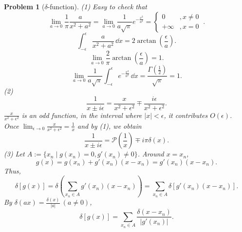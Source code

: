 \documentclass{article}
\theoremstyle{1}
\newtheorem{problem}{Problem}
\begin{document}
\begin{problem}[$\delta$-function]
    (1) Easy to check that 
    \begin{equation}
        \lim_{a\rightarrow0}\frac{1}{\pi}\frac{a}{x^2+a^2}=\lim_{a\rightarrow0}\frac{1}{a\sqrt{\pi}}e^{-\frac{x^2}{a^2}}=\left\{\begin{matrix}
            0&,x\not=0\\
            +\infty&,x=0
        \end{matrix}\ .\right.
    \end{equation}
    \begin{equation}
        \int_{-\epsilon}^{\epsilon}\frac{a}{x^2+a^2}\, \dd{x}=2\arctan(\frac{\epsilon}{a}).
    \end{equation}
    \begin{equation}
        \lim_{a\rightarrow0}\frac{2}{\pi}\arctan(\frac{\epsilon}{a})=1.
    \end{equation}
    \begin{equation}
        \lim_{a\rightarrow0}\frac{1}{a\sqrt{\pi}}\int_{-\epsilon}^{\epsilon}e^{-\frac{x^2}{a^2}}\, \dd{x}=\frac{\Gamma(\frac{1}{2})}{\sqrt{\pi}}=1.
    \end{equation}
    (2) \begin{equation}
        \frac{1}{x\pm i\epsilon}=\frac{x}{x^2+\epsilon^2}\mp\frac{i\epsilon}{x^2+\epsilon^2}.
    \end{equation}
    $\frac{x}{x^2+\epsilon^2}$ is an odd function, in the interval where $\left|x\right|<\epsilon$, it contributes $O(\epsilon)$. Once $\lim_{\epsilon\rightarrow0}\frac{x}{x^2+\epsilon^2}=\frac{1}{x}$ and by (1), we obtain
    \begin{equation}
        \boxed{\frac{1}{x\pm i\epsilon}=\mathcal{P}\left(\frac{1}{x}\right)\mp i\pi\delta(x).}
    \end{equation}
    (3) Let $A:=\{x_n\mid g(x_n)=0,g'(x_n)\not=0\}$. Around $x=x_n$,
    \begin{equation}
        g(x)=g(x_n)+g'(x_n)(x-x_n)=g'(x_n)(x-x_n).
    \end{equation}
    Thus, 
    \begin{equation}
        \delta[g(x)]=\delta(\sum_{x_n\in A}g'(x_n)(x-x_n))=\sum_{x_n\in A}\delta[g'(x_n)(x-x_n)].
    \end{equation}
    By $\delta(ax)=\frac{\delta(x)}{\left|a\right|}\ (a\not=0)$,
    \begin{equation}
        \boxed{\delta[g(x)]=\sum_{x_n\in A}\frac{\delta(x-x_n)}{\left|g'(x_n)\right|}.}
    \end{equation}

\end{problem}
\end{document}
